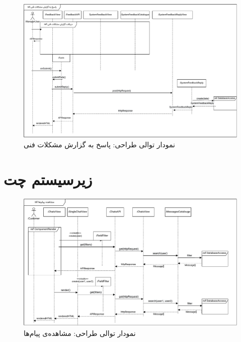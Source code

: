 \begin{figure}[ht!]
	\centering
	\includegraphics[scale=0.8]{figs/design-sequence/3-40.pdf}
	\caption{نمودار توالی طراحی: پاسخ به گزارش مشکلات فنی}
\end{figure}

\FloatBarrier
\newpage

\eject \pdfpagewidth=10in \pdfpageheight=9in

\section{زیرسیستم چت}

\begin{figure}[ht!]
	\centering
	\includegraphics[scale=0.8]{figs/design-sequence/3-47.pdf}
	\caption{نمودار توالی طراحی: مشاهده‌ی پیام‌ها}
\end{figure}
\FloatBarrier
\newpage


